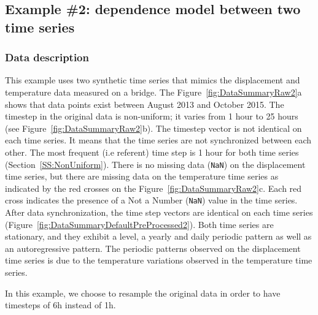 \subsection{Example \#2: dependence model between two time series}
\label{S:ExampleDispTemp}

\subsubsection{Data description}

This example uses two synthetic time series that mimics the displacement and temperature data measured on a bridge.
The  Figure~\ref{fig:DataSummaryRaw2}a shows that data points exist between August 2013 and October 2015.
The timestep in the original data is non-uniform; it varies from 1 hour to 25 hours (see Figure~\ref{fig:DataSummaryRaw2}b). 
The timestep vector is not identical on each time series. 
It means that the time series are not synchronized between each other.
The most frequent (i.e referent) time step is 1 hour for both time series (Section~\ref{SS:NonUniform}).
There is no missing data (\lstinline[basicstyle = \mlttfamily \small, backgroundcolor = \color{light-gray}]!NaN!) on the displacement time series, but there are missing data on the temperature time series as indicated by the red crosses on the Figure~\ref{fig:DataSummaryRaw2}c.
Each red cross indicates the presence of a Not a Number (\lstinline[basicstyle = \mlttfamily \small, backgroundcolor = \color{light-gray}]!NaN!) value in the time series.
After data synchronization, the time step vectors are identical on each time series (Figure~\ref{fig:DataSummaryDefaultPreProcessed2}).
Both time series are stationary, and they exhibit a level, a yearly and daily periodic pattern as well as an autoregressive pattern.
The periodic patterns observed on the displacement time series is due to the temperature variations observed in the temperature time series.

In this example, we choose to resample the original data in order to have timesteps of 6h instead of 1h. 


